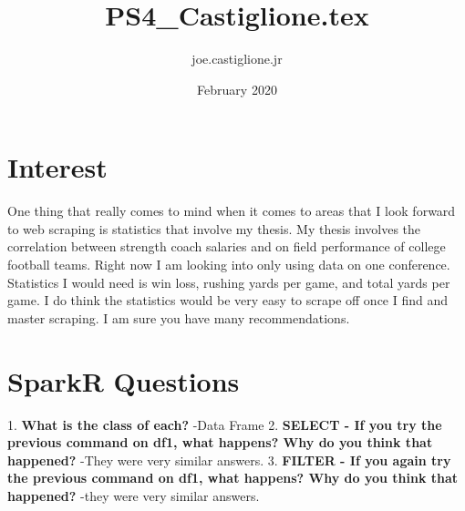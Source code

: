 \documentclass{article}
\title{PS4_Castiglione.tex}
\author{joe.castiglione.jr }
\date{February 2020}
\begin{document}
\maketitle

\section{Interest}
One thing that really comes to mind when it comes to areas that I look forward to web scraping is statistics that involve my thesis. My thesis involves the correlation between strength coach salaries and on field performance of college football teams. Right now I am looking into only using data on one conference. Statistics I would need is win loss, rushing yards per game, and total yards per game. I do think the statistics would be very easy to scrape off once I find and master scraping. I am sure you have many recommendations. 


\section{SparkR Questions}
1. \textbf{What is the class of each?}
    -Data Frame
2. \textbf{SELECT - If you try the previous command on df1, what happens? Why do you think that happened?}
    -They were very similar answers. 
3. \textbf{FILTER - If you again try the previous command on df1, what happens? Why do you think that happened?}
    -they were very similar answers. 
\end{document}
